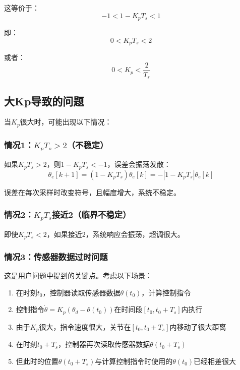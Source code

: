 \documentclass[12pt,a4paper]{article}
\begin{document}
这等价于：
\begin{equation}
-1 < 1 - K_p T_s < 1
\end{equation}

即：
\begin{equation}
0 < K_p T_s < 2
\end{equation}

或者：
\begin{equation}
0 < K_p < \frac{2}{T_s}
\end{equation}

\subsection{大Kp导致的问题}

当$K_p$很大时，可能出现以下情况：

\subsubsection{情况1：$K_p T_s > 2$（不稳定）}

如果$K_p T_s > 2$，则$1 - K_p T_s < -1$，误差会振荡发散：
\begin{equation}
\theta_e[k+1] = (1 - K_p T_s)\theta_e[k] = -|1 - K_p T_s|\theta_e[k]
\end{equation}

误差在每次采样时改变符号，且幅度增大，系统不稳定。

\subsubsection{情况2：$K_p T_s$接近2（临界不稳定）}

即使$K_p T_s < 2$，如果接近2，系统响应会振荡，超调很大。

\subsubsection{情况3：传感器数据过时问题}

这是用户问题中提到的关键点。考虑以下场景：

\begin{enumerate}
\item 在时刻$t_0$，控制器读取传感器数据$\theta(t_0)$，计算控制指令
\item 控制指令$\dot{\theta} = K_p(\theta_d - \theta(t_0))$在时间段$[t_0, t_0 + T_s]$内执行
\item 由于$K_p$很大，指令速度很大，关节在$[t_0, t_0 + T_s]$内移动了很大距离
\item 在时刻$t_0 + T_s$，控制器再次读取传感器数据$\theta(t_0 + T_s)$
\item 但此时的位置$\theta(t_0 + T_s)$与计算控制指令时使用的$\theta(t_0)$已经相差很大
\end{enumerate}
\end{document}
